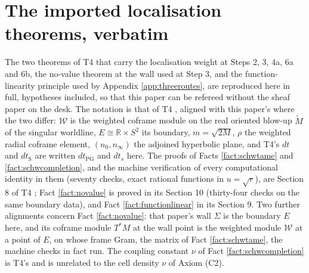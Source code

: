 \documentclass[11pt]{article}
\theoremstyle{definition}
\newcommand{\R}{\mathbb{R}}
\newcommand{\nO}{n_0}
\newcommand{\nInf}{n_\infty}
\newcommand{\shW}{\mathcal{W}}
\newcommand{\Mt}{\widetilde{M}}
\begin{document}
\section{The imported localisation theorems, verbatim}\label{app:imports}

The two theorems of T4 \cite{ButlerT4} that carry the localisation weight at Steps 2, 3, 4a, 6a and 6b, the no-value theorem at the wall used at Step 3, and the function-linearity principle used by Appendix \ref{app:threeroutes}, are reproduced here in full, hypotheses included, so that this paper can be refereed without the sheaf paper on the desk. The notation is that of T4 \cite{ButlerT4}, aligned with this paper's where the two differ: $\shW$ is the weighted coframe module on the real oriented blow-up $\Mt$ of the singular worldline, $E \cong \R \times S^2$ its boundary, $m = \sqrt{2M}$, $\rho$ the weighted radial coframe element, $(\nO, \nInf)$ the adjoined hyperbolic plane, and T4's $dt$ and $dt_{\mathrm{S}}$ are written $dt_{\mathrm{PG}}$ and $dt_s$ here. The proofs of Facts \ref{fact:schwtame} and \ref{fact:schwcompletion}, and the machine verification of every computational identity in them (seventy checks, exact rational functions in $u = \sqrt r$), are Section 8 of T4 \cite{ButlerT4}; Fact \ref{fact:novalue} is proved in its Section 10 (thirty-four checks on the same boundary data), and Fact \ref{fact:functionlinear} in its Section 9. Two further alignments concern Fact \ref{fact:novalue}: that paper's wall $\Sigma$ is the boundary $E$ here, and its coframe module $T^*M$ at the wall point is the weighted module $\shW$ at a point of $E$, on whose frame Gram, the matrix of Fact \ref{fact:schwtame}, the machine checks in fact run. The coupling constant $\nu$ of Fact \ref{fact:schwcompletion} is T4's and is unrelated to the cell density $\nu$ of Axiom (C2).
\end{document}
